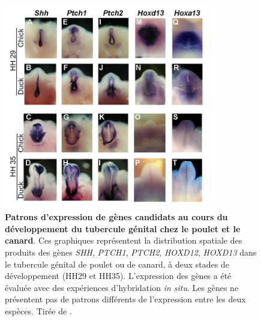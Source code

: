 \begin{figure}[hbt!]
 \centering
 \includegraphics[width=0.8\textwidth, page=1]{figures/IPLOSS/Herrera2013_fig2.png}
 \caption[Patrons d'expression de gènes candidats au cours du développement du tubercule génital chez le poulet et le canard]{
 \textbf{Patrons d'expression de gènes candidats au cours du développement du tubercule génital chez le poulet et le canard}. 
 Ces graphiques représentent la distribution spatiale des produits des gènes \textit{SHH}, \textit{PTCH1}, \textit{PTCH2}, \textit{HOXD12}, \textit{HOXD13} dans le tubercule génital de poulet ou de canard, à deux stades de développement (HH29 et HH35). L'expression des gènes a été évaluée avec des expériences d'hybridation \textit{in situ}. Les gènes ne présentent pas de patrons différents de l'expression entre les deux espèces.
 Tirée de \citet{herrera_developmental_2013}.
 \\
 }
 \label{fig:chap4-fig-herrera-insitu-hoxd13}
\end{figure}

